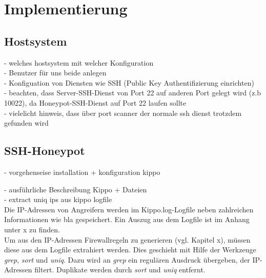 \chapter{Implementierung}
\label{ch:Implementierung}


\section{Hostsystem}
\label{sec:Hostsystem}

- welches hostsystem mit welcher Konfiguration\\
- Benutzer für uns beide anlegen\\
- Konfiguation von Diensten wie SSH (Public Key Authentifizierung einrichten)\\
- beachten, dass Server-SSH-Dienst von Port 22 auf anderen Port gelegt wird (z.b 10022), da Honeypot-SSH-Dienst auf Port 22 laufen sollte\\
- vielelicht hinweis, dass über port scanner der normale ssh dienst trotzdem gefunden wird\\

\section{SSH-Honeypot}
\label{sec:SSH-Honeypot}

- vorgehenseise installation + konfiguration kippo

- ausführliche Beschreibung Kippo + Dateien\\

- extract uniq ips aus kippo logfile \\

Die IP-Adressen von Angreifern werden im Kippo.log-Logfile neben zahlreichen Informationen wie bla %
gespeichert. Ein Auszug aus dem Logfile ist im Anhang unter x zu finden.\\

Um aus den IP-Adressen Firewallregeln zu generieren (vgl. Kapitel x), müssen diese aus dem Logfile extrahiert werden. Dies geschieht mit Hilfe der Werkzeuge \textit{grep}, \textit{sort} und \textit{uniq}. Dazu wird an \textit{grep} ein regulären Ausdruck übergeben, der IP-Adressen filtert. Duplikate werden durch \textit{sort} und \textit{uniq} entfernt.

